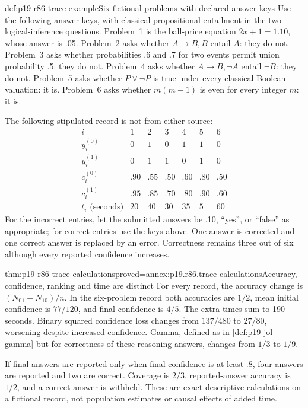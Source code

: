 \begin{hbexample}{def:p19-r86-trace-example}{Six fictional problems with declared answer keys}
Use the following answer keys, with classical propositional entailment in
the two logical-inference questions. Problem~1 is the ball-price equation
\(2x+1=1.10\), whose answer is .05. Problem~2 asks whether
\(A\to B,B\) entail \(A\): they do not. Problem~3 asks whether
probabilities .6 and .7 for two events permit union probability .5: they do
not. Problem~4 asks whether \(A\to B,\neg A\) entail \(\neg B\):
they do not. Problem~5 asks whether \(P\lor\neg P\) is true under
every classical Boolean valuation: it is. Problem~6 asks whether
\(m(m-1)\) is even for every integer \(m\): it is.

The following stipulated record is not from either source:
\[
\begin{array}{c|rrrrrr}
 i&1&2&3&4&5&6\\\hline
 y_i^{(0)}&0&1&0&1&1&0\\
 y_i^{(1)}&0&1&1&0&1&0\\
 c_i^{(0)}&.90&.55&.50&.60&.80&.50\\
 c_i^{(1)}&.95&.85&.70&.80&.90&.60\\
 t_i\text{ (seconds)}&20&40&30&35&5&60
\end{array}
\]
For the incorrect entries, let the submitted answers be .10, ``yes'', or
``false'' as appropriate; for correct entries use the keys above. One answer
is corrected and one correct answer is replaced by an error. Correctness
remains three out of six although every reported confidence increases.
\end{hbexample}

\begin{hbtheorem}{thm:p19-r86-trace-calculations}{proved=annex:p19.r86.trace-calculations}{Accuracy, confidence, ranking and time are distinct}
For every record, the accuracy change is \((N_{01}-N_{10})/n\).
In the six-problem record both accuracies are \(1/2\), mean initial
confidence is \(77/120\), and final confidence is \(4/5\).
The extra times sum to 190 seconds. Binary squared confidence loss changes
from \(137/480\) to \(27/80\), worsening despite increased confidence.
Gamma, defined as in \ref{def:p19-jol-gamma} but for correctness of these
reasoning answers, changes from \(1/3\) to \(1/9\).

If final answers are reported only when final confidence is at least .8,
four answers are reported and two are correct. Coverage is \(2/3\),
reported-answer accuracy is \(1/2\), and a correct answer is withheld.
These are exact descriptive calculations on a fictional record, not population
estimates or causal effects of added time.
\end{hbtheorem}

